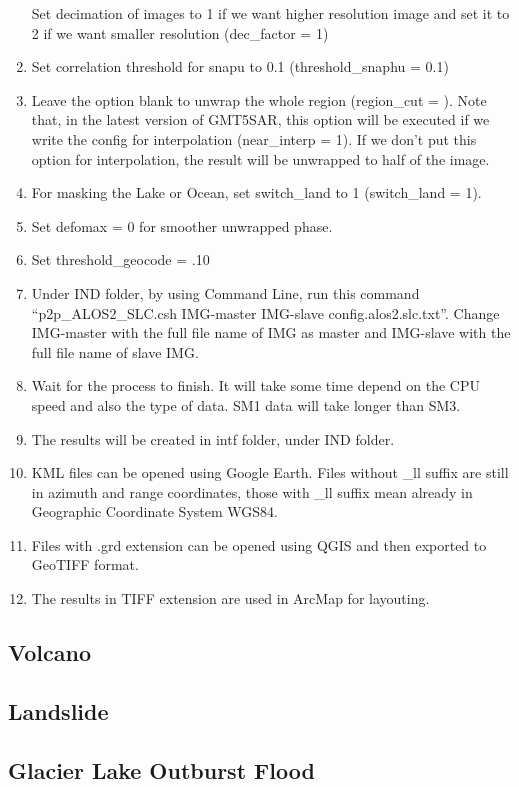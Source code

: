 \documentclass[]{book}
\theoremstyle{definition}
\theoremstyle{definition}
\theoremstyle{definition}
\theoremstyle{remark}
\begin{document}
\begin{enumerate}
  Set decimation of images to 1 if we want higher resolution image and
  set it to 2 if we want smaller resolution (dec\_factor = 1)
\item
  Set correlation threshold for snapu to 0.1 (threshold\_snaphu = 0.1)
\item
  Leave the option blank to unwrap the whole region (region\_cut = ).
  Note that, in the latest version of GMT5SAR, this option will be
  executed if we write the config for interpolation (near\_interp = 1).
  If we don't put this option for interpolation, the result will be
  unwrapped to half of the image.
\item
  For masking the Lake or Ocean, set switch\_land to 1 (switch\_land =
  1).
\item
  Set defomax = 0 for smoother unwrapped phase.
\item
  Set threshold\_geocode = .10
\item
  Under IND folder, by using Command Line, run this command
  ``p2p\_ALOS2\_SLC.csh IMG-master IMG-slave config.alos2.slc.txt''.
  Change IMG-master with the full file name of IMG as master and
  IMG-slave with the full file name of slave IMG.
\item
  Wait for the process to finish. It will take some time depend on the
  CPU speed and also the type of data. SM1 data will take longer than
  SM3.
\item
  The results will be created in intf folder, under IND folder.
\item
  KML files can be opened using Google Earth. Files without \_ll suffix
  are still in azimuth and range coordinates, those with \_ll suffix
  mean already in Geographic Coordinate System WGS84.
\item
  Files with .grd extension can be opened using QGIS and then exported
  to GeoTIFF format.
\item
  The results in TIFF extension are used in ArcMap for layouting.
\end{enumerate}

\subsection{Volcano}\label{volcano}

\subsection{Landslide}\label{landslide}

\subsection{Glacier Lake Outburst
Flood}\label{glacier-lake-outburst-flood}
\end{document}
